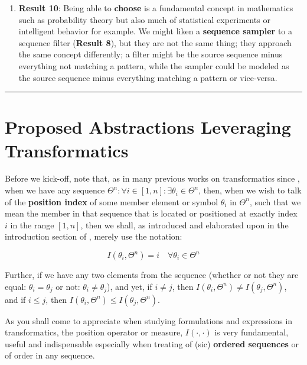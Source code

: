 \documentclass[a4paper, 18pt]{book} %
\begin{document}
\begin{appendices}
{\begin{enumerate}
\item \textbf{Result 10}: Being able to \textbf{choose} is a fundamental concept in mathematics such as probability theory but also much of statistical experiments\cite{lutalo2025rng} or intelligent behavior\cite{Lutalo2025transpsy} for example. We might liken a \textbf{sequence sampler} to a sequence filter (\textbf{Result 8}), but they are not the same thing; they approach the same concept differently; a filter  might be the source sequence minus everything not matching a pattern, while the sampler could be modeled as the source sequence minus everything matching a pattern or vice-versa.

\end{enumerate} 

}
\noindent\rule{\linewidth}{0.4pt}


\section{Proposed Abstractions Leveraging Transformatics}
\label{SECPROP}

Before we kick-off, note that, as in many previous works on transformatics since \cite{transformatics}, when we have any sequence $\Theta^n : \forall i \in [1,n] : \exists \theta_i \in \Theta^n$, then, when we wish to talk of the \textbf{position index} of some member element or symbol $\theta_i$ in $\Theta^n$, such that we mean the member in that sequence that is located or positioned at exactly index $i$ in the range $[1,n]$, then we shall, as introduced and elaborated upon in the introduction section of \cite{transformatics}, merely use the notation:

\vspace{1em}
\begin{equation}
I(\theta_i, \Theta^n) = i \quad \forall \theta_i \in \Theta^n
\end{equation}
\vspace{1em}

Further, if we have any two elements from the sequence (whether or not they are equal: $\theta_i = \theta_j$ or not: $\theta_i \neq \theta_j$), and yet, if $i \neq j$, then $I(\theta_i, \Theta^n) \neq I(\theta_j, \Theta^n)$, and if $i \leq j$, then $I(\theta_i, \Theta^n) \leq I(\theta_j, \Theta^n)$. 

As you shall come to appreciate when studying formulations and expressions in transformatics, the position operator or measure, $I(\cdot, \cdot)$ is very fundamental, useful and indispensable especially when treating of (sic) \textbf{ordered sequences} or of order in any sequence.


\end{appendices}
\end{document}
